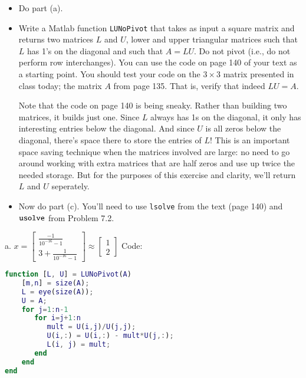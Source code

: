 \documentclass[12pt]{article}
\makeatletter
\theoremstyle{homework}
\newenvironment{exercise}[1]
{\def\@currentlabel{#1}\exercisecore}
{\endexercisecore}
\makeatother
\begin{document}
\begin{exercise} {Problem 5.3 [Modified]} \strut

\begin{itemize}
	\item Do part (a).
	\item Write a Matlab function {\tt LUNoPivot} that 
	takes as input a square matrix and returns two matrices $L$ and $U$,
	lower and upper triangular matrices such that $L$ has 1's
	on the diagonal and such that $A=LU$.  Do not pivot (i.e., do not perform row interchanges).  You can use the code on page 140
	of your text as a starting point. You should test your code on the 
	$3\times 3$ matrix presented in class today; the matrix $A$ from
	page 135.  That is, verify that indeed $LU=A$.

	Note that the code on page 140 is being sneaky.  Rather than building two matrices, it builds just one. Since $L$ always has 1s on the diagonal, it only has interesting entries below the diagonal.  And since $U$ is all zeros below the diagonal, there's space there to store the entries of $L$!  This is an important space saving technique when the matrices involved are large: no need to go around working with extra matrices that are half zeros and use up twice the needed storage.  But for the purposes of this exercise and clarity,
	we'll return $L$ and $U$ seperately.
	\item Now do part (c). You'll need to use {\tt lsolve} from the
	text (page 140) and ${\tt usolve}$ from Problem 7.2.
\end{itemize}
\end{exercise}
5.3 a.
\newline 
$x = 
\begin{bmatrix}
\frac{-1}{10^{-16}-1}\\
3 + \frac{1}{10^{-16}-1}
\end{bmatrix}
\approx
\begin{bmatrix}
1\\
2
\end{bmatrix}
$
\newline
Code:
\begin{lstlisting}[language=Matlab]
function [L, U] = LUNoPivot(A)
    [m,n] = size(A);
    L = eye(size(A));
    U = A;
    for j=1:n-1
       for i=j+1:n
          mult = U(i,j)/U(j,j);
          U(i,:) = U(i,:) - mult*U(j,:);
          L(i, j) = mult;
       end
    end
end

\end{lstlisting}
\newline
\end{document}
